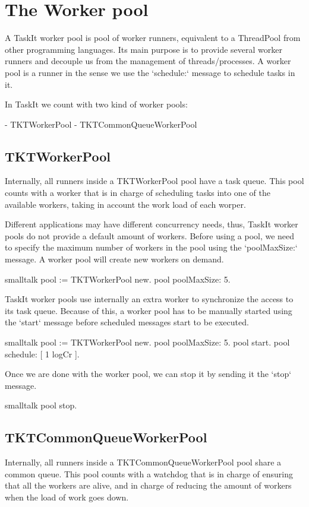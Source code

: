 \documentclass[10pt,twoside,english]{_support/latex/sbabook/sbabook}
\begin{document}
\section{The Worker pool}
A TaskIt worker pool is pool of worker runners, equivalent to a ThreadPool from other programming languages. Its main purpose is to provide several worker runners and decouple us from the management of threads/processes. A worker pool is a runner in the sense we use the `schedule:` message to schedule tasks in it. 

In TaskIt we count with two kind of worker pools: 

 - TKTWorkerPool  
 - TKTCommonQueueWorkerPool
\subsection{TKTWorkerPool}
Internally, all runners inside a TKTWorkerPool pool have a task queue. This pool counts with a worker that is in charge of scheduling tasks into one of the available workers, taking in account the work load of each worper. 

Different applications may have different concurrency needs, thus, TaskIt worker pools do not provide a default amount of workers. Before using a pool, we need to specify the maximum number of workers in the pool using the `poolMaxSize:` message. A worker pool will create new workers on demand. 

\begin{displaycode}{smalltalk}
pool := TKTWorkerPool new.
pool poolMaxSize: 5.
\end{displaycode}

TaskIt worker pools use internally an extra worker to synchronize the access to its task queue. Because of this, a worker pool has to be manually started using the `start` message before scheduled messages start to be executed.

\begin{displaycode}{smalltalk}
pool := TKTWorkerPool new.
pool poolMaxSize: 5.
pool start.
pool schedule: [ 1 logCr ].
\end{displaycode}

Once we are done with the worker pool, we can stop it by sending it the `stop` message.

\begin{displaycode}{smalltalk}
pool stop.
\end{displaycode}
\subsection{TKTCommonQueueWorkerPool}
Internally, all runners inside a TKTCommonQueueWorkerPool pool share a common queue. This pool counts with a watchdog that is in charge of ensuring that all the workers are alive, and in charge of reducing the amount of workers when the load of work goes down. 
\end{document}
